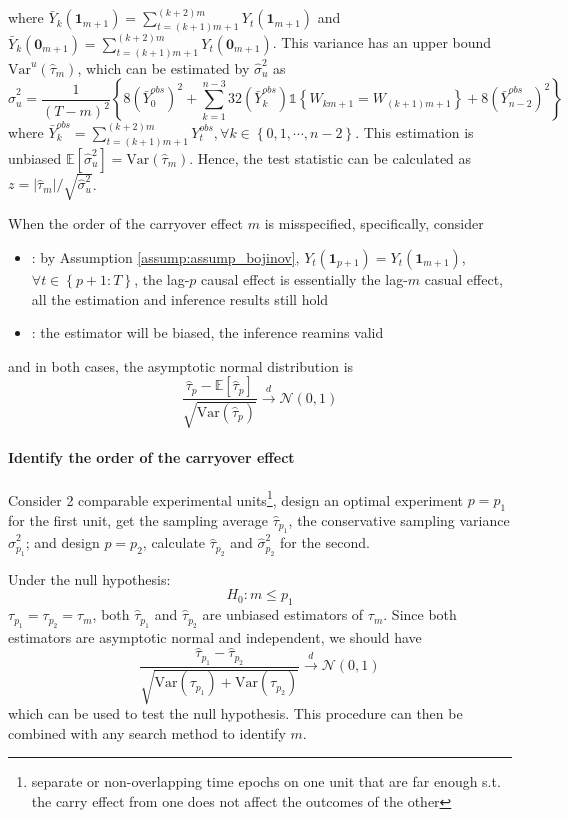 \documentclass[twoside]{article}
\begin{document}
where $\bar{Y}_k(\mathbf{1}_{m+1}) = \sum^{(k+2)m}_{t=(k+1)m+1} Y_t(\mathbf{1}_{m+1})$ and $\bar{Y}_k(\mathbf{0}_{m+1}) = \sum^{(k+2)m}_{t=(k+1)m+1}Y_t(\mathbf{0}_{m+1})$. This variance has an upper bound $\mathrm{Var}^u(\hat{\tau}_m)$, which can be estimated by $\hat{\sigma}^2_u$ as 
\begin{equation*}
    \hat{\sigma}^2_u = \frac{1}{(T-m)^2} \left\{8 \left(\bar{Y}^{obs}_0\right)^2 + \sum^{n-3}_{k=1}32\left(\bar{Y}^{obs}_k\right)\mathbb{1}\left\{W_{km+1}=W_{(k+1)m+1}\right\} + 8 \left(\bar{Y}^{obs}_{n-2}\right)^2 \right\}
\end{equation*}
where $\bar{Y}^{obs}_k = \sum^{(k+2)m}_{t=(k+1)m+1}Y_t^{obs},\forall k\in\left\{0,1,\cdots,n-2\right\}$. This estimation is unbiased $\mathbb{E}\left[\hat{\sigma}^2_u\right] = \mathrm{Var}\left(\hat{\tau}_m\right)$.
Hence, the test statistic can be calculated as $z= \left\vert \hat{\tau}_m \right\vert / \sqrt{\hat{\sigma}^2_u}$.

When the order of the carryover effect $m$ is misspecified, specifically, consider 
\begin{itemize}
    \item {}: by Assumption \ref{assump:assump_bojinov}, $Y_t(\mathbf{1}_{p+1}) = Y_t(\mathbf{1}_{m+1})$, $\forall t\in\left\{p+1:T\right\}$, the lag-$p$ causal effect is essentially the lag-$m$ casual effect, all the estimation and inference results still hold 
    \item {}: the estimator will be biased, the inference reamins valid
\end{itemize}
and in both cases, the asymptotic normal distribution is $$ \frac{\hat{\tau}_p- \mathbb{E}[\hat{\tau}_p] }{\sqrt{\mathrm{Var}\left(\hat{\tau}_p\right)}} \xrightarrow{d} \mathcal{N}(0,1) $$

\paragraph*{Identify the order of the carryover effect} 
Consider 2 comparable experimental units\footnote{separate or non-overlapping time epochs on one unit that are far enough s.t. the carry effect from one does not affect the outcomes of the other},
design an optimal experiment $p=p_1$ for the first unit, get the sampling average $\hat{\tau}_{p_1}$, the conservative sampling variance $\hat{\sigma}^2_{p_1}$; and design $p=p_2$, calculate $\hat{\tau}_{p_2}$ and $\hat{\sigma}^2_{p_2}$ for the second.

Under the null hypothesis: $$ H_0: m\leq p_1 $$
$\tau_{p_1}=\tau_{p_2}=\tau_m$, both $\hat{\tau}_{p_1}$ and $\hat{\tau}_{p_2}$ are unbiased estimators of $\tau_m$. Since both estimators are asymptotic normal and independent, we should have 
$$ \frac{\hat{\tau}_{p_1}-\hat{\tau}_{p_2}}{\sqrt{ \mathrm{Var}(\tau_{p_1}) + \mathrm{Var}(\tau_{p_2}) }} \xrightarrow{d} \mathcal{N}(0,1) $$
which can be used to test the null hypothesis. This procedure can then be combined with any search method to identify $m$.
\end{document}
